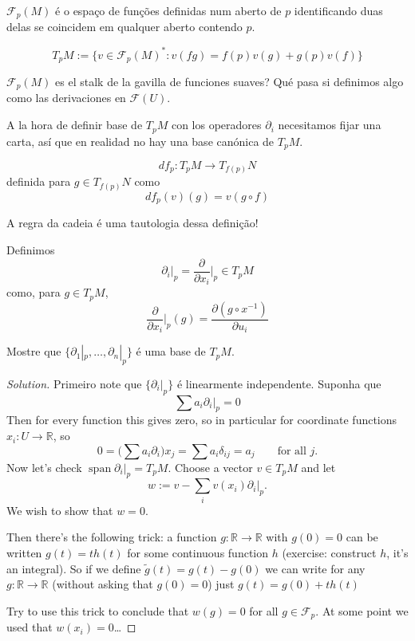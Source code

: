 \begin{defn}\leavevmode
\(\mathcal{F}_p(M)\) é o espaço de funções definidas num aberto de \(p\) identificando duas delas se coincidem em qualquer aberto contendo \(p\).

\[T_pM:=\{v \in \mathcal{F}_p(M)^*:v(fg)=f(p)v(g)+g(p)v(f)\}\]
\end{defn}

\begin{question}\leavevmode
\(\mathcal{F}_p(M)\) es el stalk de la gavilla de funciones suaves? Qué pasa si definimos algo como las derivaciones en \(\mathcal{F}(U)\).

A la hora de definir base de \(T_pM\) con los operadores \(\partial_i\) necesitamos fijar una carta, así que en realidad no hay una base canónica de \(T_pM\).
\end{question}

\begin{defn}\leavevmode
\[df_p:T_pM \to T_{f(p)}N\]
definida para \(g \in T_{f(p)}N\) como
\[df_p(v)(g)=v(g \circ f)\]
\end{defn}

\begin{remark}\leavevmode
A regra da cadeia é uma tautologia dessa definição!
\end{remark}

\begin{defn}\leavevmode
Definimos
\[\partial_i |_{p}=\frac{\partial }{\partial x_i}\Big|_{p}\in T_pM\]
como, para \(g \in T_pM\),
\[\frac{\partial }{\partial x_i}\Big|_{p}(g)=\frac{\partial (g \circ x^{-1})}{\partial u_i}\]
\end{defn}

\begin{exercise}\leavevmode
Mostre que \(\{\partial_1|_{p},\ldots, \partial_n|_{p}\}\) é uma base de \(T_pM\).
\end{exercise}

\begin{proof}[Solution]\leavevmode
Primeiro note que \(\{\partial_i|_{p}\}\) é linearmente independente. Suponha que 
\[\sum a_i \partial_i|_{p} =0\]
Then for every function this gives zero, so in particular for coordinate functions \(x_i:U \to \mathbb{R}\), so
\[0=\Big(\sum a_i \partial_i\Big)x_j=\sum a_i \delta_{ij}=a_j\qquad \text{for all \(j\).} \]
Now let's check \(\operatorname{span}\partial_i|_{p}=T_pM\). Choose a vector \(v \in T_pM\) and let
\[w:=v-\sum_{i}v(x_i)\partial_i|_{p}.\]
We wish to show that \(w=0\).

Then there's the following trick: a function \(g:\mathbb{R} \to \mathbb{R}\) with \(g(0)=0\) can be written \(g(t)=th(t)\) for some continuous function \(h\) (exercise: construct \(h\), it's an integral). So if we define \(\tilde{g}(t)=g(t)-g(0)\) we can write for any \(g: \mathbb{R} \to \mathbb{R}\) (without asking that \(g(0)=0\)) just \(g(t)=g(0)+th(t)\)

Try to use this trick to conclude that \(w(g)=0\) for all \(g \in \mathcal{F}_p\). At some point we used that \(w(x_i)=0\)…

\end{proof}

